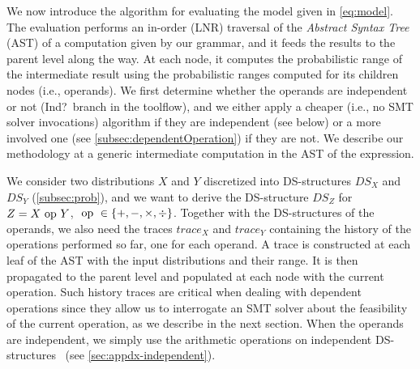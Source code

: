 %
We now introduce the algorithm for evaluating the model given in \cref{eq:model}.
%
The evaluation performs an in-order (LNR) traversal of the \emph{Abstract
Syntax Tree} (AST) of a computation given by our grammar, and it feeds the
results to the parent level along the way.
%
At each node, it computes the probabilistic range of the intermediate result
using the probabilistic ranges computed for its children nodes (i.e.,
operands).
%
We first determine whether the operands are independent or not (Ind?\ branch in the toolflow),
and we either apply a cheaper (i.e., no SMT solver invocations) algorithm if they are independent (see below) or
a more involved one (see \cref{subsec:dependentOperation}) if they are not.
%
We describe our methodology at a generic intermediate computation in the AST of the expression. 


We consider two distributions $X$ and $Y$ discretized into DS-structures $DS_{X}$ and $DS_{Y}$ (\cref{subsec:prob}), and we want to derive the DS-structure $DS_Z$ for $Z=X~\mathrm{op}~ Y$,  $~\mathrm{op}~ \in \{+,-,\times,\div\}$.
%
Together with the DS-structures of the operands, we also need the traces $trace_X$ and $trace_Y$ containing the history of the operations performed so far, one for each operand. A trace is constructed at each leaf of the AST with the input distributions and their range. It is then propagated to the parent level and populated at each node with the current operation. 
%
Such history traces are critical when dealing with dependent operations since they allow us to interrogate an SMT solver about the feasibility of the current operation, as we describe in the next section.
%
When the operands are independent, we simply use the arithmetic operations on independent DS-structures~\cite{bouissou2012generalization}
(see \cref{sec:appdx-independent}).


